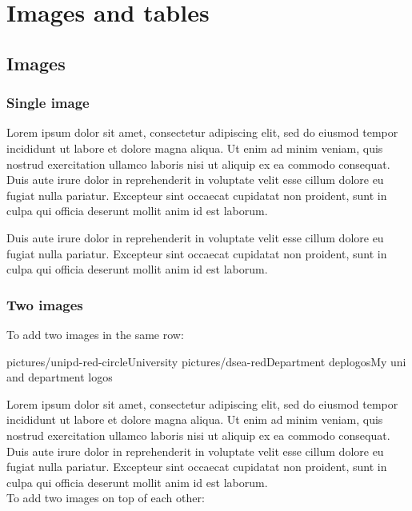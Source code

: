 
\chapter{Images and tables}

\section{Images}
\label{images}

\subsection{Single image}

Lorem ipsum dolor sit amet, consectetur adipiscing elit, sed do eiusmod tempor incididunt ut labore et dolore magna aliqua. Ut enim ad minim veniam, quis nostrud exercitation ullamco laboris nisi ut aliquip ex ea commodo consequat. Duis aute irure dolor in reprehenderit in voluptate velit esse cillum dolore eu fugiat nulla pariatur. Excepteur sint occaecat cupidatat non proident, sunt in culpa qui officia deserunt mollit anim id est laborum.

\begin{outerImage}
\end{outerImage}

Duis aute irure dolor in reprehenderit in voluptate velit esse cillum dolore eu fugiat nulla pariatur.  Excepteur sint occaecat cupidatat non proident, sunt in culpa qui officia deserunt mollit anim id est laborum.

\subsection{Two images}

To add two images in the same row:

\begin{outerImage}
 \innerImageTwoH
 {pictures/unipd-red-circle}{University}
 {pictures/dsea-red}{Department}
 {deplogos}{My uni and department logos}
\end{outerImage}

Lorem ipsum dolor sit amet, consectetur adipiscing elit, sed do eiusmod tempor incididunt ut labore et dolore magna aliqua. Ut enim ad minim veniam, quis nostrud exercitation ullamco laboris nisi ut aliquip ex ea commodo consequat. Duis aute irure dolor in reprehenderit in voluptate velit esse cillum dolore eu fugiat nulla pariatur. Excepteur sint occaecat cupidatat non proident, sunt in culpa qui officia deserunt mollit anim id est laborum.\\
To add two images on top of each other:

